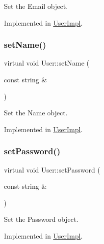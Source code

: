 Set the Email object. 



Implemented in \hyperlink{classUserImpl_abbd8347c11bd2ea93d37ec123b42dc6b}{User\+Impl}.

\mbox{\label{classUser_a47339f4f166d9baa023fdd59e81c965d}} 
\subsubsection{\texorpdfstring{set\+Name()}{setName()}}
{\footnotesize\ttfamily virtual void User\+::set\+Name (\begin{DoxyParamCaption}\item[{const string \&}]{ }\end{DoxyParamCaption})\hspace{0.3cm}{\ttfamily [pure virtual]}}



Set the Name object. 



Implemented in \hyperlink{classUserImpl_a30507ad79190a2ad7d896b6c4a55fab4}{User\+Impl}.

\mbox{\label{classUser_a809c17ec3427917ae2e641d171cb99d2}} 
\subsubsection{\texorpdfstring{set\+Password()}{setPassword()}}
{\footnotesize\ttfamily virtual void User\+::set\+Password (\begin{DoxyParamCaption}\item[{const string \&}]{ }\end{DoxyParamCaption})\hspace{0.3cm}{\ttfamily [pure virtual]}}



Set the Password object. 



Implemented in \hyperlink{classUserImpl_a85b0f1b2faebc315a2f5e4a128137101}{User\+Impl}.

\mbox{\label{classUser_ab6a6689e3581c70af166b2eb537df6fb}} 

